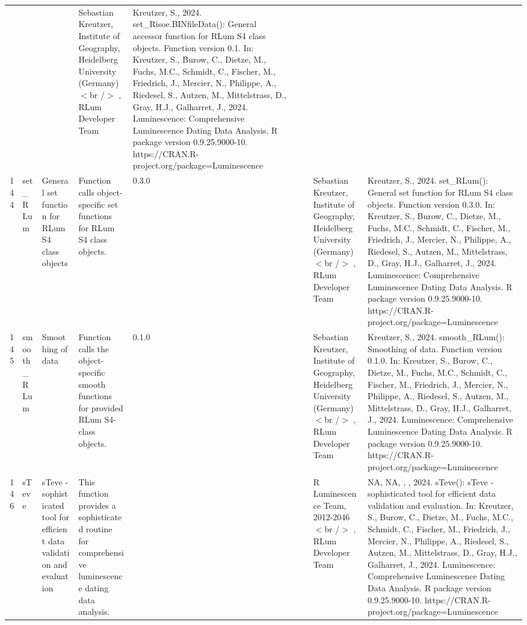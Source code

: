 \begin{table}[ht]
\begin{tabular}{rllllllll}
 &  &  & Sebastian Kreutzer, Institute of Geography, Heidelberg University (Germany)$<$br /$>$ , RLum Developer Team & Kreutzer, S., 2024. set\_Risoe.BINfileData(): General accessor function for RLum S4 class objects. Function version 0.1. In: Kreutzer, S., Burow, C., Dietze, M., Fuchs, M.C., Schmidt, C., Fischer, M., Friedrich, J., Mercier, N., Philippe, A., Riedesel, S., Autzen, M., Mittelstrass, D., Gray, H.J., Galharret, J., 2024. Luminescence: Comprehensive Luminescence Dating Data Analysis. R package version 0.9.25.9000-10. https://CRAN.R-project.org/package=Luminescence
 \\ 
  144 & set\_RLum & General set function for RLum S4 class objects & Function calls object-specific set functions for RLum S4 class objects. & 0.3.0
 &  &  & Sebastian Kreutzer, Institute of Geography, Heidelberg University (Germany)$<$br /$>$ , RLum Developer Team & Kreutzer, S., 2024. set\_RLum(): General set function for RLum S4 class objects. Function version 0.3.0. In: Kreutzer, S., Burow, C., Dietze, M., Fuchs, M.C., Schmidt, C., Fischer, M., Friedrich, J., Mercier, N., Philippe, A., Riedesel, S., Autzen, M., Mittelstrass, D., Gray, H.J., Galharret, J., 2024. Luminescence: Comprehensive Luminescence Dating Data Analysis. R package version 0.9.25.9000-10. https://CRAN.R-project.org/package=Luminescence
 \\ 
  145 & smooth\_RLum & Smoothing of data & Function calls the object-specific smooth functions for provided RLum S4-class objects. & 0.1.0
 &  &  & Sebastian Kreutzer, Institute of Geography, Heidelberg University (Germany)$<$br /$>$ , RLum Developer Team & Kreutzer, S., 2024. smooth\_RLum(): Smoothing of data. Function version 0.1.0. In: Kreutzer, S., Burow, C., Dietze, M., Fuchs, M.C., Schmidt, C., Fischer, M., Friedrich, J., Mercier, N., Philippe, A., Riedesel, S., Autzen, M., Mittelstrass, D., Gray, H.J., Galharret, J., 2024. Luminescence: Comprehensive Luminescence Dating Data Analysis. R package version 0.9.25.9000-10. https://CRAN.R-project.org/package=Luminescence
 \\ 
  146 & sTeve & sTeve - sophisticated tool for efficient data validation and evaluation & This function provides a sophisticated routine for comprehensive luminescence dating data analysis. &  &  &  & R Luminescence Team, 2012-2046$<$br /$>$ , RLum Developer Team & NA, NA, , , 2024. sTeve(): sTeve - sophisticated tool for efficient data validation and evaluation. In: Kreutzer, S., Burow, C., Dietze, M., Fuchs, M.C., Schmidt, C., Fischer, M., Friedrich, J., Mercier, N., Philippe, A., Riedesel, S., Autzen, M., Mittelstrass, D., Gray, H.J., Galharret, J., 2024. Luminescence: Comprehensive Luminescence Dating Data Analysis. R package version 0.9.25.9000-10. https://CRAN.R-project.org/package=Luminescence

\end{tabular}
\end{table}
